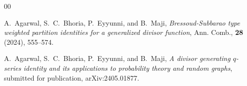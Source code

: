 \documentclass[11pt,reqno]{amsart}
\renewcommand{\(}{\left\(}
\renewcommand{\)}{\right\)}
\renewcommand{\[}{\left\[}
\renewcommand{\]}{\right\]}
\numberwithin{equation}{section}
\theoremstyle{plain}
\begin{document}
\begin{thebibliography}{00}

 A.~Agarwal, S.~C.~Bhoria, P.~Eyyunni, and B.~Maji, \emph{Bressoud-Subbarao type weighted partition identities for a generalized divisor function}, Ann. Comb., \textbf{28} (2024), 555--574. 

 A.~Agarwal, S.~C.~Bhoria, P.~Eyyunni, and B.~Maji, \emph{A divisor generating $q$-series identity and its applications to probability theory and random graphs}, submitted for publication, arXiv:2405.01877.  
 
 
 
 
 
 
 
 
 
 
 

\end{thebibliography}
\end{document}
